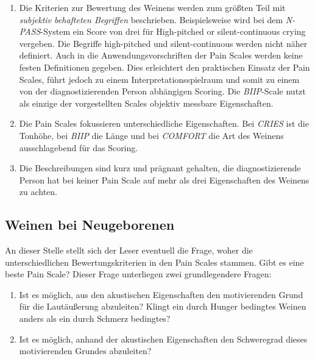 \begin{enumerate}
	
	\item Die Kriterien zur Bewertung des Weinens werden zum größten Teil mit \emph{subjektiv behafteten Begriffen} beschrieben. Beispielsweise wird bei dem \emph{N-PASS}-System ein Score von drei für \glqq High-pitched or silent-continuous crying\grqq{} vergeben. Die Begriffe \glqq high-pitched\grqq{} und \glqq silent-continuous\grqq{} werden nicht näher definiert.  Auch in die Anwendungsvorschriften der Pain Scales werden keine festen Definitionen gegeben. Dies erleichtert den praktischen Einsatz der Pain Scales, führt jedoch zu einem Interpretationsspielraum und somit zu einem von der diagnostizierenden Person abhängigen Scoring. Die \emph{BIIP}-Scale nutzt als einzige der vorgestellten Scales objektiv messbare Eigenschaften. 
	
	\item Die Pain Scales fokussieren unterschiedliche Eigenschaften. Bei \emph{CRIES} ist die Tonhöhe, bei \emph{BIIP} die Länge und bei \emph{COMFORT} die Art des Weinens ausschlagebend für das Scoring.
	
	\item Die Beschreibungen sind kurz und prägnant gehalten, die diagnostizierende Person hat bei keiner Pain Scale auf mehr als drei Eigenschaften des Weinens zu achten.
\end{enumerate}


\subsection{Weinen bei Neugeborenen}

An dieser Stelle stellt sich der Leser eventuell die Frage, woher die unterschiedlichen Bewertungskriterien in den Pain Scales stammen. Gibt es eine \glqq beste\grqq{} Pain Scale? Dieser Frage unterliegen zwei grundlegendere Fragen:

\begin{enumerate}
	\item Ist es möglich, aus den akustischen Eigenschaften den motivierenden Grund für die Lautäußerung abzuleiten?  Klingt ein durch Hunger bedingtes Weinen anders als ein durch Schmerz bedingtes?
	\item Ist es möglich, anhand der akustischen Eigenschaften den Schweregrad dieses motivierenden Grundes abzuleiten?
\end{enumerate}

